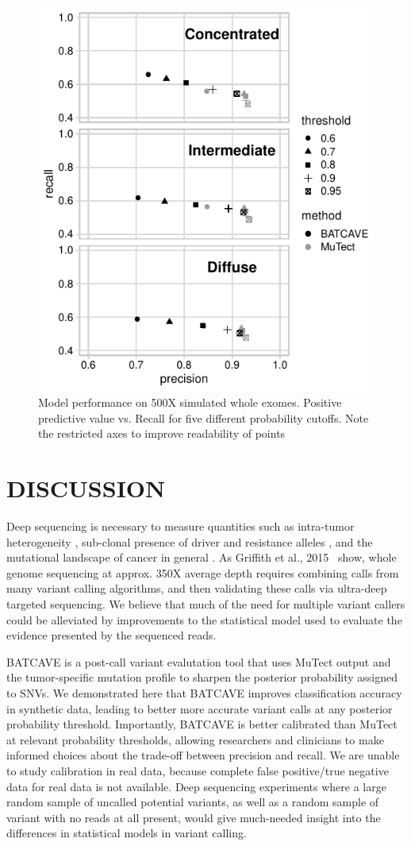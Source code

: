 \documentclass[a4,center,fleqn]{NAR}
\newcommand{\batcave}{BATCAVE }
\begin{document}
\begin{figure}
  \begin{center}
  \includegraphics[width=.45\textwidth]{figures/ppv_wes.pdf}
  \end{center}
  \caption{Model performance on 500X simulated whole exomes. 
  Positive predictive value vs. Recall for five different probability cutoffs. 
  Note the restricted axes to improve readability of points}
\label{NAR-ppv_fig}
\end{figure}



\section{DISCUSSION}
 
Deep sequencing is necessary to measure quantities such as intra-tumor heterogeneity \citep{Shi2018}, sub-clonal presence of driver and resistance alleles \cite{Griffith2015}, and the mutational landscape of cancer in general \cite{Zehir2017}.  
As Griffith et al., 2015~\citep{Griffith2015} show, whole genome sequencing at approx. 350X average depth requires combining calls from many variant calling algorithms, and then validating these calls via ultra-deep targeted sequencing. 
We believe that much of the need for multiple variant callers could be alleviated by improvements to the statistical model used to evaluate the evidence presented by the sequenced reads. 

\batcave is a post-call variant evalutation tool that uses MuTect output and the tumor-specific mutation profile to sharpen the posterior probability assigned to SNVs.
We demonstrated here that \batcave improves classification accuracy in synthetic data, leading to better more accurate variant calls at any posterior probability threshold.
Importantly, \batcave is better calibrated than MuTect at relevant probability thresholds, allowing researchers and clinicians to make informed choices about the trade-off between precision and recall.
We are unable to study calibration in real data, because complete false positive/true negative data for real data is not available. 
Deep sequencing experiments where a large random sample of uncalled potential variants, as well as a random sample of variant with no reads at all present, would give much-needed insight into the differences in statistical models in variant calling.
\end{document}
